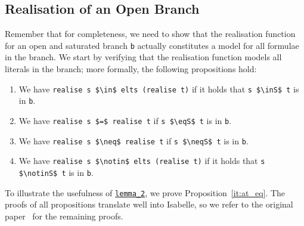 \documentclass[
  sigplan,
  10pt,
  ]{acmart}
\newcommand{\inS}{\in_\text{s}}
\newcommand{\notinS}{\notin_\text{s}}
\newcommand{\eqS}{=_\text{s}}
\newcommand{\neqS}{\neq_\text{s}}
\begin{document}
\subsection{Realisation of an Open Branch\label{sec:real}}
Remember that for completeness, we need to show that the realisation function for an open and saturated branch \lstinline!b! actually constitutes a model for all formulae in the branch.
We start by verifying that the realisation function models all literals in the branch; more formally, the following propositions hold:
\begin{enumerate}[label={(\roman*)}]
  \item\label{it:at_mem} We have \lstinline!realise s $\in$ elts (realise t)! if it holds that \lstinline!s $\inS$ t! is in \lstinline!b!. 
  \item\label{it:at_eq} We have \lstinline!realise s $=$ realise t! if \lstinline!s $\eqS$ t! is in \lstinline!b!.
  \item\label{it:af_eq} We have \lstinline!realise s $\neq$ realise t! if \lstinline!s $\neqS$ t! is in \lstinline!b!.
  \item\label{it:af_mem} We have \lstinline!realise s $\notin$ elts (realise t)! if it holds that \lstinline!s $\notinS$ t! is in \lstinline!b!. 
\end{enumerate}
To illustrate the usefulness of \hyperref[lst:lemma_2]{\lstinline!lemma_2!}, we prove Proposition~\ref{it:at_eq}.
The proofs of all propositions translate well into Isabelle, so we refer to the original paper~\cite{new_fast_tableau} for the remaining proofs. 
\end{document}
